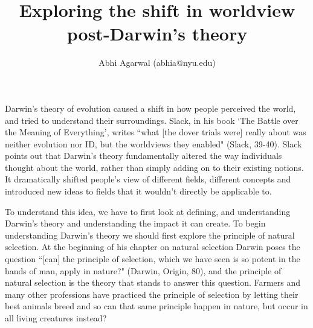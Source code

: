 \documentclass[11pt, oneside]{article}
\title{Exploring the shift in worldview post-Darwin's theory}
\author{Abhi Agarwal (abhia@nyu.edu)}
\date{}
\begin{document}
\maketitle



\par Darwin's theory of evolution caused a shift in how people perceived the world, and tried to understand their surroundings. Slack, in his book `The Battle over the Meaning of Everything', writes ``what [the dover trials were] really about was neither evolution nor ID, but the worldviews they enabled" (Slack, 39-40). Slack points out that Darwin's theory fundamentally altered the way individuals thought about the world, rather than simply adding on to their existing notions. It dramatically shifted people's view of different fields, different concepts and introduced new ideas to fields that it wouldn't directly be applicable to.


\par To understand this idea, we have to first look at defining, and understanding Darwin's theory and understanding the impact it can create. To begin understanding Darwin's theory we should first explore the principle of natural selection. At the beginning of his chapter on natural selection Darwin poses the question ``[can] the principle of selection, which we have seen is so potent in the hands of man, apply in nature?" (Darwin, Origin, 80), and the principle of natural selection is the theory that stands to answer this question. Farmers and many other professions have practiced the principle of selection by letting their best animals breed and so can that same principle happen in nature, but occur in all living creatures instead? 
\end{document}
